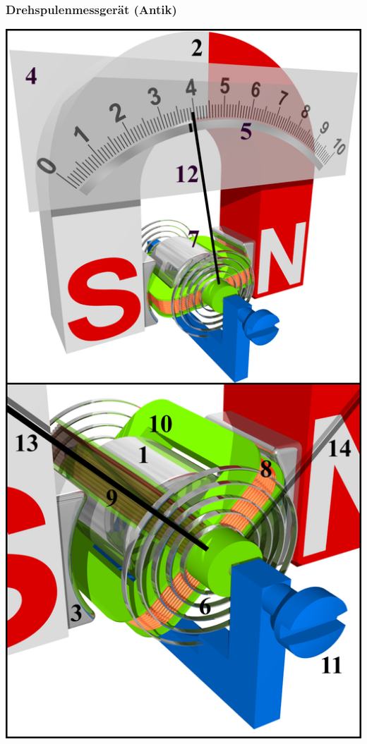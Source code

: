 \begin{frame}
    \frametitle{Drehspulenmessgerät (Antik)}
	\begin{minipage}{0.3\textwidth}
	    \includegraphics[width=.95\textwidth,height=.8\textheight,keepaspectratio]{e17/drehspulenMess.png}\\
	\end{minipage}

\end{frame}
